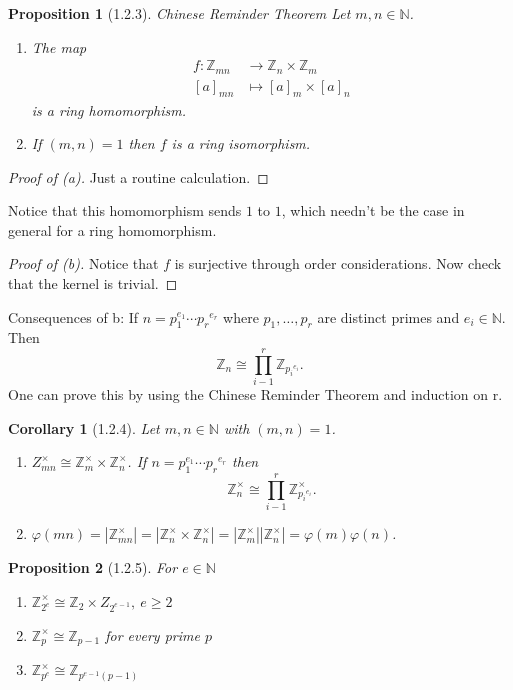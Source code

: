 \documentclass[11pt,leqno,oneside]{amsart}
\newcommand{\N}{{\mathbb N}} %
\newcommand{\Z}{{\mathbb Z}} %
\newcommand{\isom}{\mathrel{\cong}}
\newcommand{\primedecomposition}[3]{#1_1^{#2_1} \cdots {#1_{#3}}^{#2_{#3}}}
\newtheorem*{prop*}{Proposition}
\newtheorem*{cor*}{Corollary}
\theoremstyle{definition}
\numberwithin{equation}{section}
\begin{document}
\begin{prop*}[1.2.3]{Chinese Reminder Theorem}
  Let \(m,n \in \N\).
  \begin{enumerate}
  \item[(a)] The map
    \begin{align*}
      f \colon \Z_{mn} &\to \Z_n \times \Z_m\\
      [a]_{mn}&\mapsto [a]_m \times [a]_n
    \end{align*}
    is a ring homomorphism.
  \item[(b)] If \((m,n)=1\) then \(f\) is a ring isomorphism.
  \end{enumerate}
\end{prop*}
\begin{proof}[Proof of (a)]
  Just a routine calculation.
\end{proof}
Notice that this homomorphism sends \(1\) to \(1\), which needn't be the case in
general for a ring homomorphism.
\begin{proof}[Proof of (b)]
  Notice that \(f\) is surjective through order considerations. Now check that
  the kernel is trivial.
\end{proof}
Consequences of b: If \(n=\primedecomposition{p}{e}{r}\) where
\(p_1,\ldots,p_r\) are distinct primes and \(e_i \in \N\). Then
\[\Z_n \isom \prod_{i-1}^r \Z_{{p_i}^{e_i}}.\]
One can prove this by using the Chinese Reminder Theorem and induction on r.
\begin{cor*}[1.2.4]
  Let \(m,n \in \N\) with \((m,n)=1\).
  \begin{enumerate}
  \item[(a)] \(Z_{mn}^\times \isom \Z_m^\times \times \Z_n^\times\). If
    \(n=\primedecomposition{p}{e}{r}\) then
    \[\Z_n^\times \isom \prod_{i-1}^r \Z^\times_{{p_i}^{e_i}}.\]
  \item[(b)]
    \(\varphi(mn)=|\Z_{mn}^\times|=|\Z_{n}^\times\times
    \Z_{n}^\times|=|\Z_{m}^\times||\Z_{n}^\times|=\varphi(m)\varphi(n)\).
  \end{enumerate}
\end{cor*}
\begin{prop*}[1.2.5]
  For \(e \in \N\)
  \begin{enumerate}
    \item[(a)] \(\Z_{2^e}^\times \isom \Z_2 \times Z_{2^{e-1}},\ e \ge 2\)
    \item[(b)] \(\Z_p^\times \isom \Z_{p-1}\) for every prime \(p\)
    \item[(c)] \(\Z_{p^e}^\times \isom \Z_{p^{e-1}(p-1)}\)
  \end{enumerate}
\end{prop*}
\end{document}
